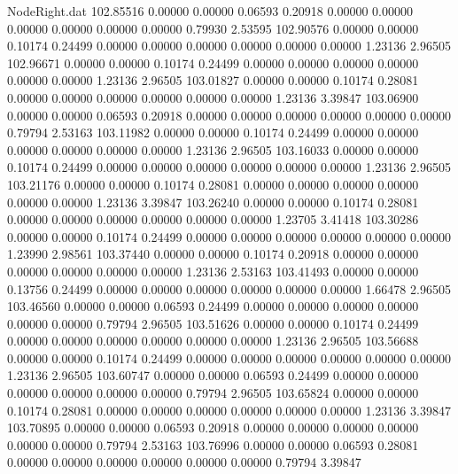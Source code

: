 \begin{filecontents}{NodeRight.dat}
 102.85516    0.00000    0.00000     0.06593    0.20918    0.00000    0.00000    0.00000    0.00000    0.00000    0.00000    0.79930    2.53595
 102.90576    0.00000    0.00000     0.10174    0.24499    0.00000    0.00000    0.00000    0.00000    0.00000    0.00000    1.23136    2.96505
 102.96671    0.00000    0.00000     0.10174    0.24499    0.00000    0.00000    0.00000    0.00000    0.00000    0.00000    1.23136    2.96505
 103.01827    0.00000    0.00000     0.10174    0.28081    0.00000    0.00000    0.00000    0.00000    0.00000    0.00000    1.23136    3.39847
 103.06900    0.00000    0.00000     0.06593    0.20918    0.00000    0.00000    0.00000    0.00000    0.00000    0.00000    0.79794    2.53163
 103.11982    0.00000    0.00000     0.10174    0.24499    0.00000    0.00000    0.00000    0.00000    0.00000    0.00000    1.23136    2.96505
 103.16033    0.00000    0.00000     0.10174    0.24499    0.00000    0.00000    0.00000    0.00000    0.00000    0.00000    1.23136    2.96505
 103.21176    0.00000    0.00000     0.10174    0.28081    0.00000    0.00000    0.00000    0.00000    0.00000    0.00000    1.23136    3.39847
 103.26240    0.00000    0.00000     0.10174    0.28081    0.00000    0.00000    0.00000    0.00000    0.00000    0.00000    1.23705    3.41418
 103.30286    0.00000    0.00000     0.10174    0.24499    0.00000    0.00000    0.00000    0.00000    0.00000    0.00000    1.23990    2.98561
 103.37440    0.00000    0.00000     0.10174    0.20918    0.00000    0.00000    0.00000    0.00000    0.00000    0.00000    1.23136    2.53163
 103.41493    0.00000    0.00000     0.13756    0.24499    0.00000    0.00000    0.00000    0.00000    0.00000    0.00000    1.66478    2.96505
 103.46560    0.00000    0.00000     0.06593    0.24499    0.00000    0.00000    0.00000    0.00000    0.00000    0.00000    0.79794    2.96505
 103.51626    0.00000    0.00000     0.10174    0.24499    0.00000    0.00000    0.00000    0.00000    0.00000    0.00000    1.23136    2.96505
 103.56688    0.00000    0.00000     0.10174    0.24499    0.00000    0.00000    0.00000    0.00000    0.00000    0.00000    1.23136    2.96505
 103.60747    0.00000    0.00000     0.06593    0.24499    0.00000    0.00000    0.00000    0.00000    0.00000    0.00000    0.79794    2.96505
 103.65824    0.00000    0.00000     0.10174    0.28081    0.00000    0.00000    0.00000    0.00000    0.00000    0.00000    1.23136    3.39847
 103.70895    0.00000    0.00000     0.06593    0.20918    0.00000    0.00000    0.00000    0.00000    0.00000    0.00000    0.79794    2.53163
 103.76996    0.00000    0.00000     0.06593    0.28081    0.00000    0.00000    0.00000    0.00000    0.00000    0.00000    0.79794    3.39847

\end{filecontents}

